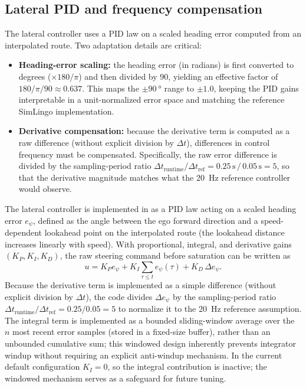 \subsection{Lateral PID and frequency compensation}
\label{sec:lateral-pid}
The lateral controller uses a PID law on a scaled heading error computed from an interpolated route. Two adaptation details are critical:
\begin{itemize}[leftmargin=*,itemsep=0.25em]
  \item \textbf{Heading-error scaling:} the heading error (in radians) is first converted to degrees ($\times 180/\pi$) and then divided by $90$, yielding an effective factor of $180/\pi/90 \approx 0.637$. This maps the $\pm\SI{90}{\degree}$ range to $\pm 1.0$, keeping the PID gains interpretable in a unit-normalized error space and matching the reference SimLingo implementation.
  \item \textbf{Derivative compensation:} because the derivative term is computed as a raw difference (without explicit division by $\Delta t$), differences in control frequency must be compensated. Specifically, the raw error difference is divided by the sampling-period ratio $\Delta t_{\text{runtime}}/\Delta t_{\text{ref}} = 0.25\,\text{s}\,/\,0.05\,\text{s} = 5$, so that the derivative magnitude matches what the \SI{20}{Hz} reference controller would observe.
\end{itemize}
The lateral controller is implemented in  as a PID law \citep{astrom1995pid} acting on a scaled heading error $e_\psi$, defined as the angle between the ego forward direction and a speed-dependent lookahead point on the interpolated route (the lookahead distance increases linearly with speed). With proportional, integral, and derivative gains $(K_P,K_I,K_D)$, the raw steering command before saturation can be written as
\begin{equation}
 u = K_P e_\psi + K_I \sum_{\tau\le t} e_\psi(\tau) + K_D\,\Delta e_\psi.
\end{equation}
Because the derivative term is implemented as a simple difference (without explicit division by $\Delta t$), the code divides $\Delta e_\psi$ by the sampling-period ratio $\Delta t_{\text{runtime}}/\Delta t_{\text{ref}} = 0.25/0.05 = 5$ to normalize it to the \SI{20}{Hz} reference assumption. The integral term is implemented as a bounded sliding-window average over the $n$ most recent error samples (stored in a fixed-size buffer), rather than an unbounded cumulative sum; this windowed design inherently prevents integrator windup without requiring an explicit anti-windup mechanism. In the current default configuration $K_I=0$, so the integral contribution is inactive; the windowed mechanism serves as a safeguard for future tuning.

